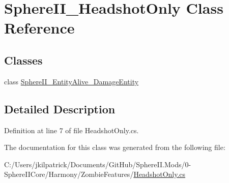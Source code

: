 \hypertarget{class_sphere_i_i___headshot_only}{}\section{Sphere\+I\+I\+\_\+\+Headshot\+Only Class Reference}
\label{class_sphere_i_i___headshot_only}
\subsection*{Classes}
\begin{DoxyCompactItemize}
\item 
class \mbox{\hyperlink{class_sphere_i_i___headshot_only_1_1_sphere_i_i___entity_alive___damage_entity}{Sphere\+I\+I\+\_\+\+Entity\+Alive\+\_\+\+Damage\+Entity}}
\end{DoxyCompactItemize}


\subsection{Detailed Description}


Definition at line 7 of file Headshot\+Only.\+cs.



The documentation for this class was generated from the following file\+:\begin{DoxyCompactItemize}
\item 
C\+:/\+Users/jkilpatrick/\+Documents/\+Git\+Hub/\+Sphere\+I\+I.\+Mods/0-\/\+Sphere\+I\+I\+Core/\+Harmony/\+Zombie\+Features/\mbox{\hyperlink{_headshot_only_8cs}{Headshot\+Only.\+cs}}\end{DoxyCompactItemize}
